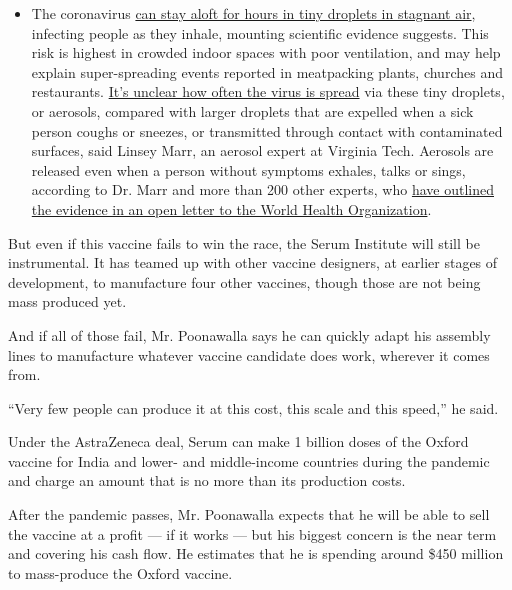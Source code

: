\begin{itemize}
  \begin{itemize}
  \tightlist
  \item
    The coronavirus
    \href{https://www.nytimes.com/2020/07/04/health/239-experts-with-one-big-claim-the-coronavirus-is-airborne.html?action=click\&pgtype=Article\&state=default\&region=MAIN_CONTENT_3\&context=storylines_faq}{can
    stay aloft for hours in tiny droplets in stagnant air}, infecting
    people as they inhale, mounting scientific evidence suggests. This
    risk is highest in crowded indoor spaces with poor ventilation, and
    may help explain super-spreading events reported in meatpacking
    plants, churches and restaurants.
    \href{https://www.nytimes.com/2020/07/06/health/coronavirus-airborne-aerosols.html?action=click\&pgtype=Article\&state=default\&region=MAIN_CONTENT_3\&context=storylines_faq}{It's
    unclear how often the virus is spread} via these tiny droplets, or
    aerosols, compared with larger droplets that are expelled when a
    sick person coughs or sneezes, or transmitted through contact with
    contaminated surfaces, said Linsey Marr, an aerosol expert at
    Virginia Tech. Aerosols are released even when a person without
    symptoms exhales, talks or sings, according to Dr. Marr and more
    than 200 other experts, who
    \href{https://academic.oup.com/cid/article/doi/10.1093/cid/ciaa939/5867798}{have
    outlined the evidence in an open letter to the World Health
    Organization}.
  \end{itemize}
\end{itemize}

But even if this vaccine fails to win the race, the Serum Institute will
still be instrumental. It has teamed up with other vaccine designers, at
earlier stages of development, to manufacture four other vaccines,
though those are not being mass produced yet.

And if all of those fail, Mr. Poonawalla says he can quickly adapt his
assembly lines to manufacture whatever vaccine candidate does work,
wherever it comes from.

``Very few people can produce it at this cost, this scale and this
speed,'' he said.

Under the AstraZeneca deal, Serum can make 1 billion doses of the Oxford
vaccine for India and lower- and middle-income countries during the
pandemic and charge an amount that is no more than its production costs.

After the pandemic passes, Mr. Poonawalla expects that he will be able
to sell the vaccine at a profit --- if it works --- but his biggest
concern is the near term and covering his cash flow. He estimates that
he is spending around \$450 million to mass-produce the Oxford vaccine.

